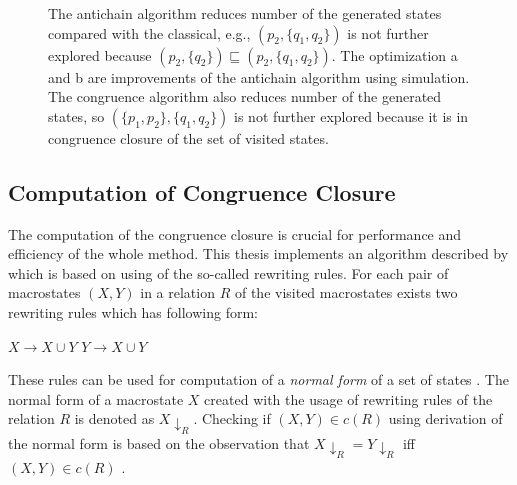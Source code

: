 \begin{figure}[bt]
\begin{center}
{{      The antichain algorithm reduces number of the generated states compared with the classical,
      e.g., $(p_2,\{q_1,q_2\})$ is not further explored because $(p_2,\{q_2\}) \sqsubseteq (p_2,\{q_1,q_2\})$. 
      The optimization a and b are improvements of the antichain algorithm using simulation. 
      The congruence algorithm also reduces number of the generated states, so $(\{p_1,p_2\},\{q_1,q_2\})$ 
      is not further explored because it is in congruence closure 
      of the set of visited states.}}
  \label{automata}
\end{center}
\end{figure}

\subsection{Computation of Congruence Closure}
\label{subsectionCongr}
The computation of the congruence closure is crucial for performance and efficiency of the whole method. This thesis implements
an algorithm described by \cite{popl13} which is based on using of the so-called rewriting rules. For each pair of macrostates $(X,Y)$ in 
a relation $R$ of the visited macrostates exists two rewriting rules which has following form:
\begin{center}
$X\rightarrow X\cup Y$ \hspace{5cm} $Y\rightarrow X\cup Y$
\end{center}

These rules can be used for computation of a \emph{normal form} of a set of states \cite{popl13}. The normal form of a macrostate $X$ created with
the usage of rewriting rules of the relation $R$ is denoted as $X{\downarrow_R}$.
Checking if $(X,Y)\in c(R)$ using derivation of the normal form is based on the observation that $X{\downarrow_R}=Y{\downarrow_R}$ 
iff $(X,Y)\in c(R)$ \cite{popl13}.

